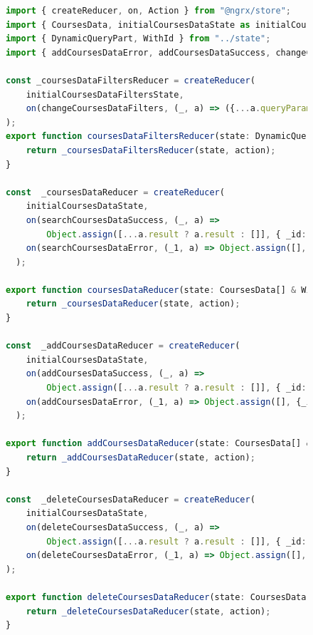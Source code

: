\begin{figure}[H]
\centering
\begin{lstlisting}[language=TypeScript, linewidth=20cm, basicstyle=\tiny]
import { createReducer, on, Action } from "@ngrx/store";
import { CoursesData, initialCoursesDataState as initialCoursesDataState, initialCoursesDataFiltersState as initialCoursesDataFiltersState } from "./courses.state";
import { DynamicQueryPart, WithId } from "../state";
import { addCoursesDataError, addCoursesDataSuccess, changeCoursesDataFilters, deleteCoursesDataError, deleteCoursesDataSuccess, searchCoursesDataError, searchCoursesDataSuccess, updateCoursesDataError, updateCoursesDataSuccess } from "./courses.actions";

const _coursesDataFiltersReducer = createReducer(
    initialCoursesDataFiltersState,
    on(changeCoursesDataFilters, (_, a) => ({...a.queryParams, _id: a._id}))
);
export function coursesDataFiltersReducer(state: DynamicQueryPart & WithId, action: Action): DynamicQueryPart & WithId{
    return _coursesDataFiltersReducer(state, action);
}

const  _coursesDataReducer = createReducer(
    initialCoursesDataState,
    on(searchCoursesDataSuccess, (_, a) =>
        Object.assign([...a.result ? a.result : []], { _id: a._id})),
    on(searchCoursesDataError, (_1, a) => Object.assign([], {_id: a._id})),
  );

export function coursesDataReducer(state: CoursesData[] & WithId, action: Action): CoursesData[] & WithId{
    return _coursesDataReducer(state, action);
}

const  _addCoursesDataReducer = createReducer(
    initialCoursesDataState,
    on(addCoursesDataSuccess, (_, a) =>
        Object.assign([...a.result ? a.result : []], { _id: a._id})),
    on(addCoursesDataError, (_1, a) => Object.assign([], {_id: a._id})),
  );

export function addCoursesDataReducer(state: CoursesData[] & WithId, action: Action): CoursesData[] & WithId{
    return _addCoursesDataReducer(state, action);
}

const  _deleteCoursesDataReducer = createReducer(
    initialCoursesDataState,
    on(deleteCoursesDataSuccess, (_, a) =>
        Object.assign([...a.result ? a.result : []], { _id: a._id})),
    on(deleteCoursesDataError, (_1, a) => Object.assign([], {_id: a._id})),
);

export function deleteCoursesDataReducer(state: CoursesData[] & WithId, action: Action): CoursesData[] & WithId{
    return _deleteCoursesDataReducer(state, action);
}


\end{lstlisting}
\end{figure}
